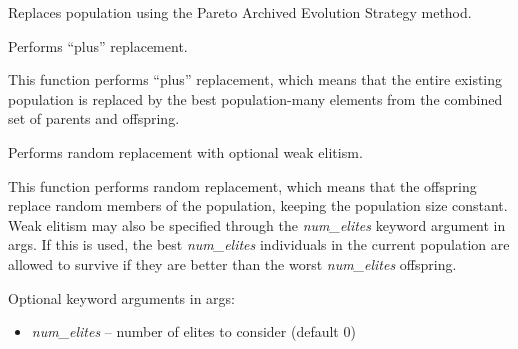 \documentclass[letterpaper,10pt,english]{sphinxmanual}
\begin{document}

\begin{fulllineitems}
\label{reference:inspyred.ec.replacers.paes_replacement}
Replaces population using the Pareto Archived Evolution Strategy method.

\end{fulllineitems}


\begin{fulllineitems}
\label{reference:inspyred.ec.replacers.plus_replacement}
Performs ``plus'' replacement.

This function performs ``plus'' replacement, which means that
the entire existing population is replaced by the best
population-many elements from the combined set of parents and 
offspring.

\end{fulllineitems}


\begin{fulllineitems}
\label{reference:inspyred.ec.replacers.random_replacement}
Performs random replacement with optional weak elitism.

This function performs random replacement, which means that
the offspring replace random members of the population, keeping
the population size constant. Weak elitism may also be specified 
through the \emph{num\_elites} keyword argument in args. If this is used, 
the best \emph{num\_elites} individuals in the current population are 
allowed to survive if they are better than the worst \emph{num\_elites}
offspring.

Optional keyword arguments in args:
\begin{itemize}
\item {} 
\emph{num\_elites} -- number of elites to consider (default 0)

\end{itemize}

\end{fulllineitems}
\end{document}
